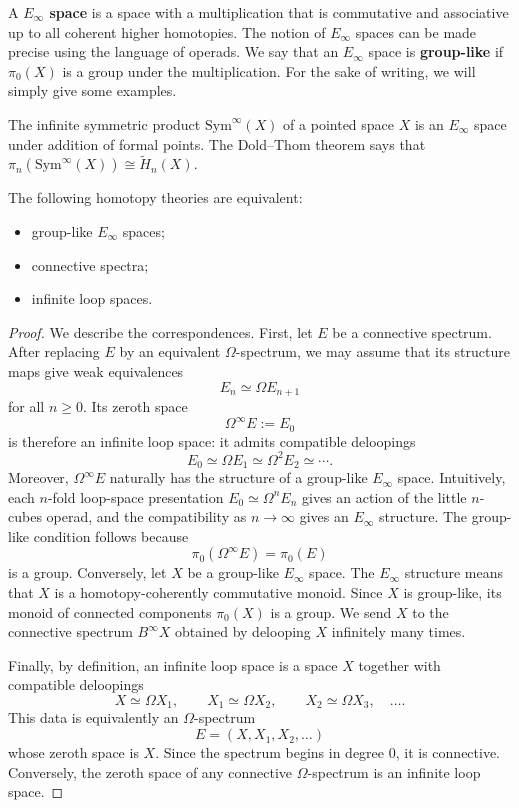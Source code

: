 \documentclass[12pt]{article}
\begin{document}
A \textbf{$E_\infty$ space} is a space with a multiplication that is commutative and associative up to all coherent higher homotopies. The notion of $E_\infty$ spaces can be made precise using the language of operads.
We say that an $E_\infty$ space is \textbf{group-like} if $\pi_0(X)$ is a group under the multiplication. For the sake of writing, we will simply give some examples.

\begin{example}
    The infinite symmetric product $\mathrm{Sym}^\infty(X)$ of a pointed space $X$ is an $E_\infty$ space under addition of formal points. The Dold--Thom theorem says that $\pi_n(\mathrm{Sym}^\infty(X)) \cong \tilde{H}_n(X)$.
\end{example}

\begin{theorem}
    The following homotopy theories are equivalent:
    \begin{itemize}
        \item group-like $E_\infty$ spaces;
        \item connective spectra;
        \item infinite loop spaces.
    \end{itemize}
\end{theorem}

\begin{proof}
    We describe the correspondences. First, let $E$ be a connective spectrum. After replacing $E$ by an equivalent $\Omega$-spectrum, we may assume that its structure maps give weak equivalences
    \[
        E_n \simeq \Omega E_{n+1}
    \]
    for all $n\geq 0$. Its zeroth space
    \[
        \Omega^\infty E := E_0
    \]
    is therefore an infinite loop space: it admits compatible deloopings
    \[
        E_0 \simeq \Omega E_1 \simeq \Omega^2 E_2 \simeq \cdots.
    \]
    Moreover, $\Omega^\infty E$ naturally has the structure of a group-like $E_\infty$ space. Intuitively, each $n$-fold loop-space presentation $E_0 \simeq \Omega^n E_n$
    gives an action of the little $n$-cubes operad, and the compatibility as $n\to\infty$ gives an $E_\infty$ structure. The group-like condition follows because
    \[
        \pi_0(\Omega^\infty E)=\pi_0(E)
    \]
    is a group. Conversely, let $X$ be a group-like $E_\infty$ space. The $E_\infty$ structure means that $X$ is a homotopy-coherently commutative monoid. Since $X$ is group-like, its monoid of connected components $\pi_0(X)$ is a group. We send $X$ to the connective spectrum $B^\infty X$ obtained by delooping $X$ infinitely many times.


    Finally, by definition, an infinite loop space is a space $X$ together with compatible deloopings
    \[
        X\simeq \Omega X_1,\qquad X_1\simeq \Omega X_2,\qquad X_2\simeq \Omega X_3,\quad \ldots .
    \]
    This data is equivalently an $\Omega$-spectrum
    \[
        E=(X,X_1,X_2,\ldots)
    \]
    whose zeroth space is $X$. Since the spectrum begins in degree $0$, it is connective. Conversely, the zeroth space of any connective $\Omega$-spectrum is an infinite loop space.
\end{proof}
\end{document}
